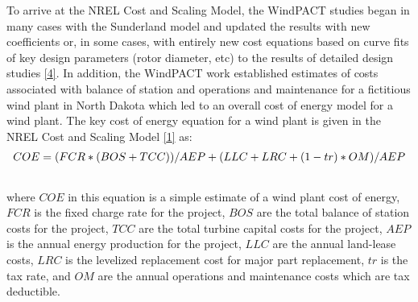 \documentclass[letterpaper,10pt,openany,oneside]{sphinxmanual}
\begin{document}
To arrive at the NREL Cost and Scaling Model, the WindPACT studies began in many cases with the Sunderland model and updated the results with new coefficients or, in some cases, with entirely new cost equations based on curve fits of key design parameters (rotor diameter, etc) to the results of detailed design studies {\hyperref[theory:4]{{[}4{]}}}.  In addition, the WindPACT work established estimates of costs associated with balance of station and operations and maintenance for a fictitious wind plant in North Dakota which led to an overall cost of energy model for a wind plant.  The key cost of energy equation for a wind plant is given in the NREL Cost and Scaling Model {\hyperref[theory:1]{{[}1{]}}} as:
\begin{gather}
\begin{split}COE = (FCR*(BOS+TCC))/AEP + (LLC + LRC + (1-tr)*OM)/AEP\end{split}\notag\\\begin{split}\end{split}\notag
\end{gather}
where $COE$ in this equation is a simple estimate of a wind plant cost of energy, $FCR$ is the fixed charge rate for the project, $BOS$ are the total balance of station costs for the project, $TCC$ are the total turbine capital costs for the project, $AEP$ is the annual energy production for the project, $LLC$ are the annual land-lease costs, $LRC$ is the levelized replacement cost for major part replacement, $tr$ is the tax rate, and $OM$ are the annual operations and maintenance costs which are tax deductible.
\end{document}
